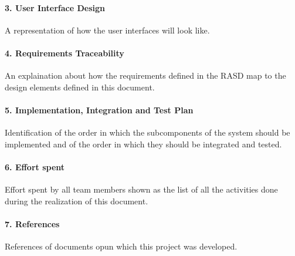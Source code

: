 \documentclass[../DD.tex]{subfiles}
\begin{document}
		\paragraph{3. User Interface Design}
		A representation of how the user interfaces will look like.
		\paragraph{4. Requirements Traceability}
		An explaination about how the requirements defined in the RASD map to the design elements defined in this document.
		\paragraph{5. Implementation, Integration and Test Plan}
		Identification of the order in which the subcomponents of the system should be implemented and of the order in which they should be integrated and tested.
		\paragraph{6. Effort spent}
		Effort spent by all team members shown as the list of all the activities done during the realization of this document.
		\paragraph{7. References}
		References of documents opun which this project was developed.
		
		
		
\end{document}
